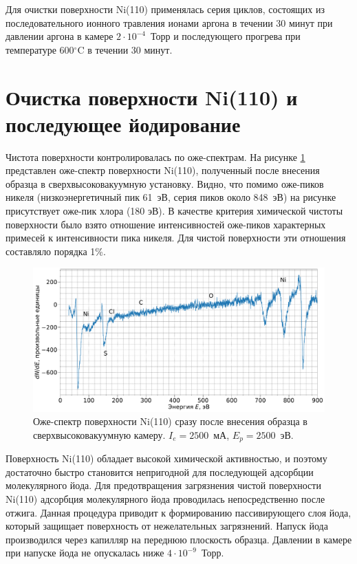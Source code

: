 \documentclass[a4paper,12pt]{article}
\theoremstyle{plain} %
\theoremstyle{definition} %
\theoremstyle{remark} %
\begin{document}
 Для очистки поверхности Ni(110) применялась серия циклов, состоящих из  последовательного ионного травления ионами аргона в течении 30 минут при
 давлении аргона в камере $2 \cdot 10^{-4}$~Торр и последующего прогрева  при температуре  600$^\circ$C в течении 30 минут.


 \section{Очистка поверхности Ni(110) и последующее йодирование}
 Чистота поверхности контролировалась по оже-спектрам. На рисунке \ref{fig:1_initial} представлен оже-спектр поверхности Ni(110), полученный после внесения образца в
 сверхвысоковакуумную установку. Видно, что помимо оже-пиков никеля (низкоэнергетичный пик 61~эВ, серия пиков около 848~эВ) на рисунке присутствует оже-пик хлора (180 эВ).  В  качестве  критерия химической  чистоты
 поверхности  было  взято  отношение  интенсивностей оже-пиков  характерных  примесей   к  интенсивности  пика  никеля.  Для  чистой поверхности эти отношения
  составляло  порядка 1\%.
  

  \begin{figure}[H]
	\centering
	\includegraphics[width=0.9\linewidth]{Initial}
	\caption{Оже-спектр поверхности Ni(110) сразу после внесения образца в сверхвысоковакуумную камеру. $I_e = 2500$~мА, $E_p = 2500$~эВ.}
	\label{fig:1_initial}
\end{figure}

 Поверхность Ni(110) обладает высокой химической  активностью, и поэтому  достаточно быстро становится непригодной для последующей
 адсорбции молекулярного йода.  Для предотвращения загрязнения чистой поверхности Ni(110)  адсорбция молекулярного йода проводилась непосредственно
 после отжига. Данная процедура приводит к формированию пассивирующего слоя йода, который  защищает поверхность от нежелательных загрязнений.
 Напуск йода производился через капилляр на переднюю плоскость образца.  Давлении в камере при напуске йода не опускалась  ниже $4\cdot 10^{-9}$~Торр.
 
\end{document}
